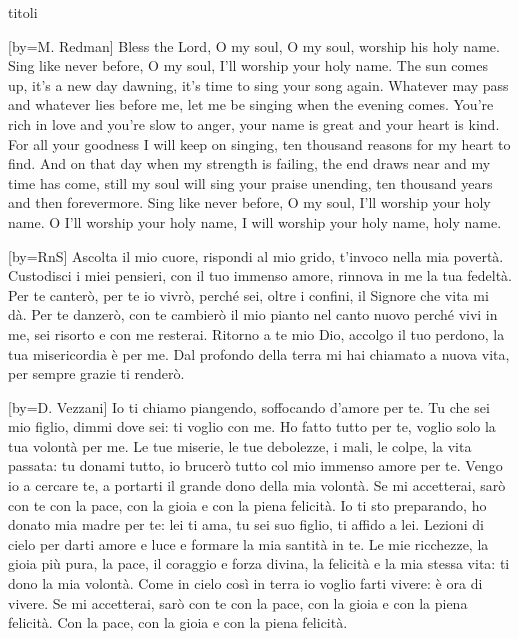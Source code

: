 \begin{songs}{titoli}

[by={M. Redman}]
\beginchorus
Bless the Lord, O my soul, O my soul,
worship his holy name.
Sing like never before, O my soul,
I'll worship your holy name.
\endchorus
\beginverse
The sun comes up, it's a new day dawning,
it's time to sing your song again.
Whatever may pass and whatever lies before me,
let me be singing when the evening comes.
\endverse
\beginverse
You're rich in love and you're slow to anger,
your name is great and your heart is kind.
For all your goodness I will keep on singing,
ten thousand reasons for my heart to find.
\endverse
\beginverse
And on that day when my strength is failing,
the end draws near and my time has come,
still my soul will sing your praise unending,
ten thousand years and then forevermore.
\endverse
\beginverse*
Sing like never before, O my soul,
I'll worship your holy name.
O I'll worship your holy name,
I will worship your holy name,
holy name.
\endverse
\endsong

[by={RnS}]
\beginverse
Ascolta il mio cuore, rispondi al mio grido,
t'invoco nella mia povertà.
Custodisci i miei pensieri, con il tuo immenso amore,
rinnova in me la tua fedeltà.
\endverse
\beginchorus
Per te canterò, per te io vivrò,
perché sei, oltre i confini,
il Signore che vita mi dà.
Per te danzerò, con te cambierò
il mio pianto nel canto nuovo
perché vivi in me, sei risorto e con me resterai.
\endchorus
\beginverse
Ritorno a te mio Dio, accolgo il tuo perdono,
la tua misericordia è per me.
Dal profondo della terra mi hai chiamato a nuova vita,
per sempre grazie ti renderò.
\endverse
\endsong

[by={D. Vezzani}]
\beginverse
Io ti chiamo piangendo,
soffocando d'amore per te.
Tu che sei mio figlio, dimmi
dove sei: ti voglio con me.
Ho fatto tutto per te,
voglio solo la tua volontà per me.
Le tue miserie, le tue debolezze,
i mali, le colpe, la vita passata:
tu donami tutto,
io brucerò tutto
col mio immenso amore per te.
\endverse
\beginchorus
Vengo io a cercare te,
a portarti il grande dono della mia volontà.
Se mi accetterai, sarò con te
con la pace, con la gioia e con la piena felicità.
\endchorus
\beginverse
Io ti sto preparando,
ho donato mia madre per te:
lei ti ama, tu sei suo figlio,
ti affido a lei.
Lezioni di cielo
per darti amore e luce
e formare la mia santità in te.
Le mie ricchezze,
la gioia più pura,
la pace, il coraggio e forza divina,
la felicità e la mia stessa vita:
ti dono la mia volontà.
\endverse
\beginverse*
Come in cielo così in terra
io voglio farti vivere:
è ora di vivere. 
\endverse
\beginverse*
Se mi accetterai, sarò con te
con la pace, con la gioia e con la piena felicità.
Con la pace, con la gioia e con la piena felicità.
\endverse
\endsong


\end{songs}
